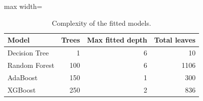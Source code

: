 \begin{table}[H]
\centering\small
\caption{Complexity of the fitted models.}
\begin{adjustbox}{max width=\linewidth}\begin{tabular}{lrrr}
\toprule
Model & Trees & Max fitted depth & Total leaves \\
\midrule
Decision Tree & 1 & 6 & 10 \\
Random Forest & 100 & 6 & 1106 \\
AdaBoost & 150 & 1 & 300 \\
XGBoost & 250 & 2 & 836 \\
\bottomrule
\end{tabular}\end{adjustbox}
\end{table}
